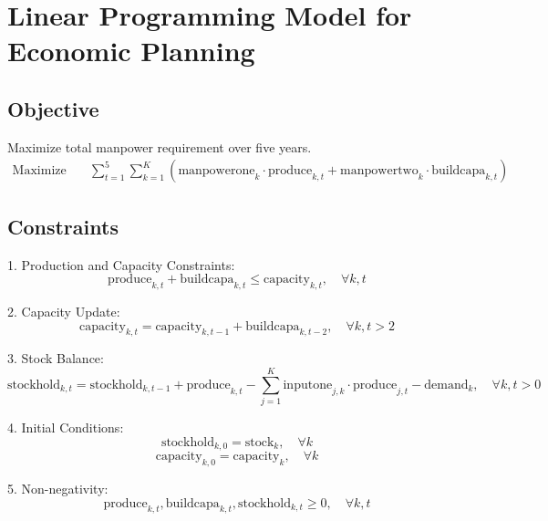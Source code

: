 \documentclass{article}
\begin{document}
\section*{Linear Programming Model for Economic Planning}

\subsection*{Objective}
Maximize total manpower requirement over five years.
\begin{align*}
\text{Maximize} \quad & \sum_{t=1}^{5} \sum_{k=1}^{K} \left( \text{manpowerone}_{k} \cdot \text{produce}_{k, t} + \text{manpowertwo}_{k} \cdot \text{buildcapa}_{k, t} \right)
\end{align*}

\subsection*{Constraints}
1. Production and Capacity Constraints:
\[
\text{produce}_{k, t} + \text{buildcapa}_{k, t} \leq \text{capacity}_{k, t}, \quad \forall k, t
\]

2. Capacity Update:
\[
\text{capacity}_{k, t} = \text{capacity}_{k, t-1} + \text{buildcapa}_{k, t-2}, \quad \forall k, t > 2
\]

3. Stock Balance:
\[
\text{stockhold}_{k, t} = \text{stockhold}_{k, t-1} + \text{produce}_{k, t} - \sum_{j=1}^{K} \text{inputone}_{j, k} \cdot \text{produce}_{j, t} - \text{demand}_{k}, \quad \forall k, t > 0
\]

4. Initial Conditions:
\[
\text{stockhold}_{k, 0} = \text{stock}_{k}, \quad \forall k
\]
\[
\text{capacity}_{k, 0} = \text{capacity}_{k}, \quad \forall k
\]

5. Non-negativity:
\[
\text{produce}_{k, t}, \text{buildcapa}_{k, t}, \text{stockhold}_{k, t} \geq 0, \quad \forall k, t
\]
\end{document}
